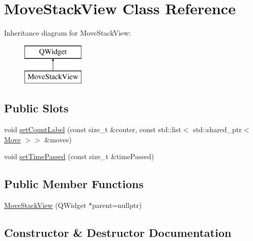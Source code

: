 \hypertarget{class_move_stack_view}{}\section{Move\+Stack\+View Class Reference}
\label{class_move_stack_view}
Inheritance diagram for Move\+Stack\+View\+:\begin{figure}[H]
\begin{center}
\leavevmode
\includegraphics[height=2.000000cm]{class_move_stack_view}
\end{center}
\end{figure}
\subsection*{Public Slots}
\begin{DoxyCompactItemize}
\item 
void \mbox{\hyperlink{class_move_stack_view_ad3439eab1b100699aa82ece0b21de8a8}{set\+Count\+Label}} (const size\+\_\+t \&couter, const std\+::list$<$ std\+::shared\+\_\+ptr$<$ \mbox{\hyperlink{struct_move}{Move}} $>$$>$ \&moves)
\item 
void \mbox{\hyperlink{class_move_stack_view_a6a70962da0c881426a408bb78cf9f974}{set\+Time\+Passed}} (const size\+\_\+t \&time\+Passed)
\end{DoxyCompactItemize}
\subsection*{Public Member Functions}
\begin{DoxyCompactItemize}
\item 
\mbox{\hyperlink{class_move_stack_view_aee51704e36aeb3f7d5a5a0c6be03b414}{Move\+Stack\+View}} (Q\+Widget $\ast$parent=nullptr)
\end{DoxyCompactItemize}


\subsection{Constructor \& Destructor Documentation}
\mbox{\label{class_move_stack_view_aee51704e36aeb3f7d5a5a0c6be03b414}} 

